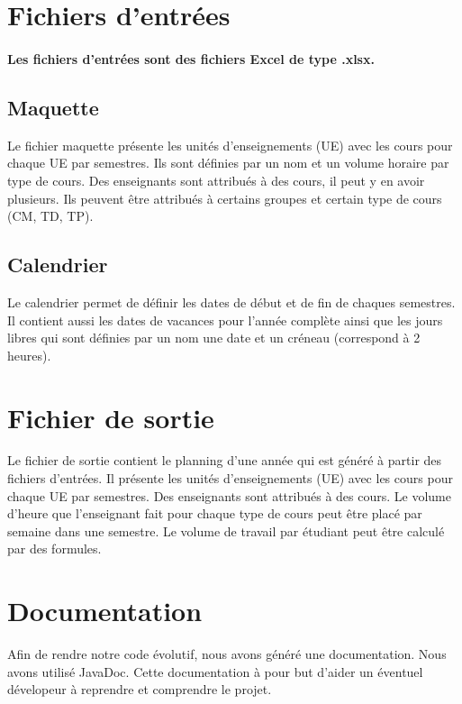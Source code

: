 \documentclass{polytech/polytech}
\begin{document}
	\section{Fichiers d'entrées}

	\paragraph{Les fichiers d'entrées sont des fichiers Excel de type .xlsx.}

	\subsection{Maquette}

	Le fichier maquette présente les unités d'enseignements (UE) avec les cours pour chaque UE par semestres.
	Ils sont définies par un nom et un volume horaire par type de cours.
	Des enseignants sont attribués à des cours, il peut y en avoir plusieurs.
	Ils peuvent être attribués à certains groupes et certain type de cours (CM, TD, TP).

	\subsection{Calendrier}

	Le calendrier permet de définir les dates de début et de fin de chaques semestres.
	Il contient aussi les dates de vacances pour l'année complète ainsi que les jours libres qui sont définies par un nom une date et un créneau (correspond à 2 heures).

	\section{Fichier de sortie}

	Le fichier de sortie contient le planning d'une année qui est généré à partir des fichiers d'entrées.
	Il présente les unités d'enseignements (UE) avec les cours pour chaque UE par semestres.
	Des enseignants sont attribués à des cours. Le volume d'heure que l'enseignant fait pour chaque type de cours peut être placé par semaine dans une semestre.
	Le volume de travail par étudiant peut être calculé par des formules.

	\section{Documentation}
	Afin de rendre notre code évolutif, nous avons généré une documentation.
	Nous avons utilisé JavaDoc.
	Cette documentation à pour but d'aider un éventuel dévelopeur à reprendre et comprendre le projet.
	
\end{document}
